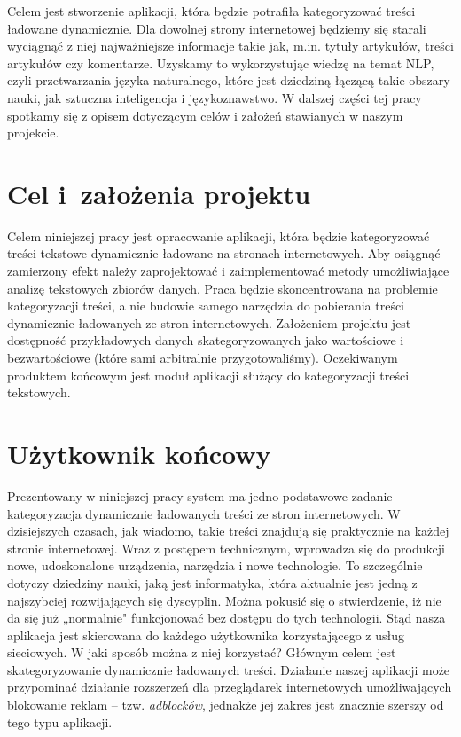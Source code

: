     Celem jest stworzenie aplikacji, która będzie potrafiła kategoryzować treści ładowane dynamicznie. Dla dowolnej strony internetowej będziemy się starali wyciągnąć z niej najważniejsze informacje takie jak, m.in.  tytuły artykułów, treści artykułów czy komentarze. Uzyskamy to wykorzystując wiedzę na temat NLP, czyli przetwarzania języka naturalnego, które jest dziedziną łączącą takie obszary nauki, jak sztuczna inteligencja i językoznawstwo. W dalszej części tej pracy spotkamy się z opisem dotyczącym celów i założeń stawianych w naszym projekcie.


\section{Cel i~założenia projektu}
\label{sec:cel}

Celem niniejszej pracy jest opracowanie aplikacji, która będzie kategoryzować treści tekstowe dynamicznie ładowane na stronach internetowych. Aby osiągnąć zamierzony efekt należy zaprojektować i zaimplementować metody umożliwiające analizę tekstowych zbiorów danych. Praca będzie skoncentrowana na problemie kategoryzacji treści, a nie budowie samego narzędzia do pobierania treści dynamicznie ładowanych ze stron internetowych. Założeniem projektu jest dostępność przykładowych danych skategoryzowanych jako wartościowe i bezwartościowe (które sami arbitralnie przygotowaliśmy). Oczekiwanym produktem końcowym jest moduł aplikacji służący do kategoryzacji treści tekstowych.


\section{Użytkownik końcowy}
\label{sec:uzytkownik}

Prezentowany w niniejszej pracy system ma jedno podstawowe zadanie – kategoryzacja dynamicznie ładowanych treści ze stron internetowych. W dzisiejszych czasach, jak wiadomo, takie treści znajdują się praktycznie na każdej stronie internetowej. Wraz z postępem technicznym, wprowadza się do produkcji nowe, udoskonalone urządzenia, narzędzia i nowe technologie. To szczególnie dotyczy dziedziny nauki, jaką jest informatyka, która aktualnie jest jedną z najszybciej rozwijających się dyscyplin. Można pokusić się o stwierdzenie, iż nie da się już „normalnie" funkcjonować bez dostępu do tych technologii. Stąd nasza aplikacja jest skierowana do każdego użytkownika korzystającego z usług sieciowych. W jaki sposób można z niej korzystać? Głównym celem jest skategoryzowanie dynamicznie ładowanych treści. Działanie naszej aplikacji może przypominać działanie rozszerzeń dla przeglądarek internetowych umożliwających blokowanie reklam – tzw. \textit{adblocków}, jednakże jej zakres jest znacznie szerszy od tego typu aplikacji. 

